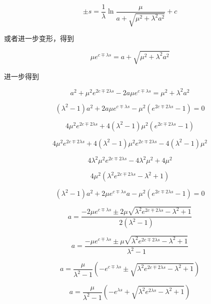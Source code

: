 \documentclass[a4paper,12pt]{article}
\numberwithin{definition}{section}
\numberwithin{lemma}{section}
\numberwithin{proposition}{section}
\numberwithin{theorem}{section}
\numberwithin{grammar}{section}
\numberwithin{program}{section}
\numberwithin{convention}{section}
\numberwithin{corollary}{section}
\begin{document}
\begin{equation}
    \pm s = \frac{1}{\lambda} \ln \frac{\mu}{a + \sqrt{\mu^2 + \lambda^2 a^2}} + c
\end{equation}

或者进一步变形，得到

\begin{equation}
    \mu e^{c \mp \lambda s} = a + \sqrt{\mu^2 + \lambda^2 a^2}
\end{equation}

进一步得到

\begin{equation}
    a^2 + \mu^2 e^{2 c \mp 2 \lambda s} - 2 a \mu e^{c \mp \lambda s} = \mu^2 + \lambda^2 a^2
\end{equation}

\begin{equation}
    (\lambda^2 - 1)a^2 + 2 a \mu e^{c \mp \lambda s} - \mu^2 (e^{2 c \mp 2 \lambda s} - 1) = 0
\end{equation}

\begin{equation}
     4 \mu^2 e^{2c \mp 2 \lambda s} + 4 (\lambda^2 - 1) \mu^2 (e^{2 c \mp 2 \lambda s} - 1)
\end{equation}

\begin{equation}
     4 \mu^2 e^{2c \mp 2 \lambda s} + 4 (\lambda^2 - 1) \mu^2 e^{2 c \mp 2 \lambda s} - 4 (\lambda^2 - 1) \mu^2
\end{equation}

\begin{equation}
     4 \lambda^2 \mu^2 e^{2 c \mp 2 \lambda s} - 4 \lambda^2 \mu^2 + 4 \mu^2
\end{equation}

\begin{equation}
     4 \mu^2 (\lambda^2  e^{2 c \mp 2 \lambda s} - \lambda^2 + 1)
\end{equation}

\begin{equation}
    (\lambda^2 - 1)a^2 + 2 \mu e^{c \mp \lambda s} a - \mu^2 (e^{2 c \mp 2 \lambda s} - 1) = 0
\end{equation}

\begin{equation}
    a = \frac{- 2 \mu e^{c \mp \lambda s} \pm 2 \mu \sqrt{\lambda^2  e^{2 c \mp 2 \lambda s} - \lambda^2 + 1}}{2(\lambda^2 - 1)}
\end{equation}

\begin{equation}
    a = \frac{- \mu e^{c \mp \lambda s} \pm \mu \sqrt{\lambda^2  e^{2 c \mp 2 \lambda s} - \lambda^2 + 1}}{\lambda^2 - 1}
\end{equation}

\begin{equation}
    a = \frac{\mu }{\lambda^2 - 1} (- e^{c \mp \lambda s} \pm \sqrt{\lambda^2  e^{2 c \mp 2 \lambda s} - \lambda^2 + 1})
\end{equation}

\begin{equation}
    a = \frac{\mu }{\lambda^2 - 1} (- e^{\lambda s} + \sqrt{\lambda^2  e^{2 \lambda s} - \lambda^2 + 1})
\end{equation}
\end{document}
